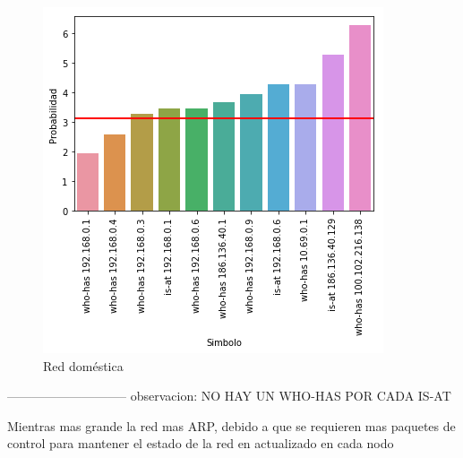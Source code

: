 \begin{figure}[H]
	\centering
	\includegraphics[width=.5\linewidth]{imagenes/manu_casa_hosts}
	\caption{Red doméstica}
\end{figure}

-----------------------------
observacion: NO HAY UN WHO-HAS POR CADA IS-AT

Mientras mas grande la red mas ARP, debido a que se requieren mas paquetes de control para mantener el estado de la red en actualizado en cada nodo